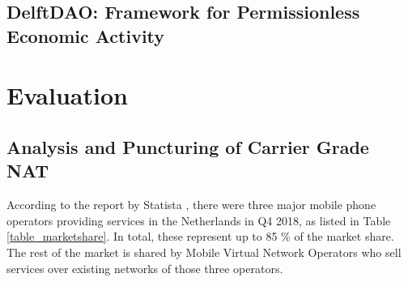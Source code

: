 







\section{DelftDAO: Framework for Permissionless Economic Activity}

\chapter{Evaluation}

\section{Analysis and Puncturing of Carrier Grade NAT}

According to the report by Statista \cite{statista:marketshare}, there were three major mobile phone operators providing services in the Netherlands in Q4 2018, as listed in Table \ref{table_marketshare}. In total, these represent up to 85 \% of the market share. The rest of the market is shared by Mobile Virtual Network Operators who sell services over existing networks of those three operators.

